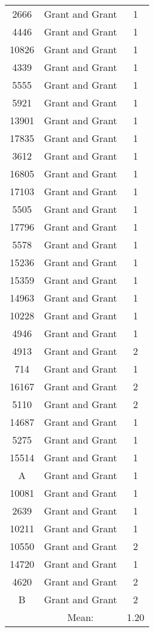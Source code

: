 \documentclass[a4paper,12pt]{article}
\begin{document}
\begin{longtable}{ccc}
  \hline
  2666 & Grant and Grant & 1 \\ 
  4446 & Grant and Grant & 1 \\ 
  10826 & Grant and Grant & 1 \\ 
  4339 & Grant and Grant & 1 \\ 
  5555 & Grant and Grant & 1 \\ 
  5921 & Grant and Grant & 1 \\ 
  13901 & Grant and Grant & 1 \\ 
  17835 & Grant and Grant & 1 \\ 
  3612 & Grant and Grant & 1 \\ 
  16805 & Grant and Grant & 1 \\ 
  17103 & Grant and Grant & 1 \\ 
  5505 & Grant and Grant & 1 \\ 
  17796 & Grant and Grant & 1 \\ 
  5578 & Grant and Grant & 1 \\ 
  15236 & Grant and Grant & 1 \\ 
  15359 & Grant and Grant & 1 \\ 
  14963 & Grant and Grant & 1 \\ 
  10228 & Grant and Grant & 1 \\ 
  4946 & Grant and Grant & 1 \\ 
  4913 & Grant and Grant & 2 \\ 
  714 & Grant and Grant & 1 \\ 
  16167 & Grant and Grant & 2 \\ 
  5110 & Grant and Grant & 2 \\ 
  14687 & Grant and Grant & 1 \\ 
  5275 & Grant and Grant & 1 \\ 
  15514 & Grant and Grant & 1 \\ 
  A & Grant and Grant & 1 \\ 
  10081 & Grant and Grant & 1 \\ 
  2639 & Grant and Grant & 1 \\ 
  10211 & Grant and Grant & 1 \\ 
  10550 & Grant and Grant & 2 \\ 
  14720 & Grant and Grant & 1 \\ 
  4620 & Grant and Grant & 2 \\ 
  B & Grant and Grant & 2 \\
  \hline
   & Mean: & 1.20 \\ 
   \hline
\end{longtable}
\end{document}
